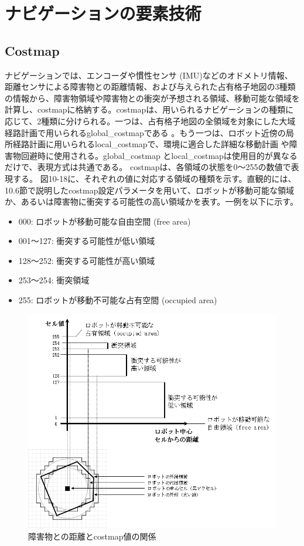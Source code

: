 \section{ナビゲーションの要素技術}

\subsection{Costmap}

ナビゲーションでは、エンコーダや慣性センサ (IMU)などのオドメトリ情報、距離センサによる障害物との距離情報、および与えられた占有格子地図の3種類の情報から、障害物領域や障害物との衝突が予想される領域、移動可能な領域を計算し、costmapに格納する。costmapは、用いられるナビゲーションの種類に応じて、2種類に分けられる。一つは、占有格子地図の全領域を対象にした大域経路計画で用いられるglobal\_costmapである  。もう一つは、ロボット近傍の局所経路計画に用いられるlocal\_costmapで、環境に適合した詳細な移動計画  や障害物回避時に使用される。global\_costmap とlocal\_costmapは使用目的が異なるだけで、表現方式は共通である。
costmapは、各領域の状態を0〜255の数値で表現する。  図10-18に、それぞれの値に対応する領域の種類を示す。直観的には、10.6節で説明したcostmap設定パラメータを用いて、ロボットが移動可能な領域か、あるいは障害物に衝突する可能性の高い領域かを表す。一例を以下に示す。

\begin{itemize}
\item 000: ロボットが移動可能な自由空間 (free area)
\item 001〜127: 衝突する可能性が低い領域
\item 128〜252: 衝突する可能性が高い領域
\item 253〜254: 衝突領域
\item 255: ロボットが移動不可能な占有空間 (occupied area)
\end{itemize}

\begin{figure}[ht]
  \centering
  \includegraphics[width=\columnwidth]{pictures/chapter10/pic_10_18.png}
  \caption{障害物との距離とcostmap値の関係}
\end{figure}


